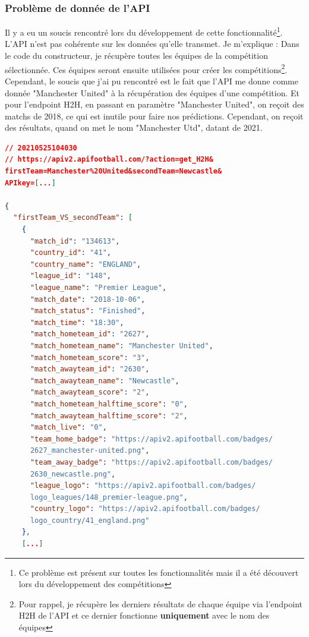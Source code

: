 \documentclass[a4paper,14pt]{extarticle}
\begin{document}
{

\subsubsection{Problème de donnée de l'API}
Il y a eu un soucis rencontré lors du développement de cette fonctionnalité\footnote{Ce problème est présent sur toutes les fonctionnalités mais il a été découvert lors du développement des compétitions}. L'API n'est pas cohérente sur les données qu'elle transmet. Je m'explique :
Dans le code du constructeur, je récupère toutes les équipes de la compétition sélectionnée. Ces équipes seront ensuite utilisées pour créer les compétitions\footnote{Pour rappel, je récupère les derniers résultats de chaque équipe via l'endpoint H2H de l'API et ce dernier fonctionne \textbf{uniquement} avec le nom des équipes}. Cependant, le soucis que j'ai pu rencontré est le fait que l'API me donne comme donnée "Manchester United" à la récupération des équipes d'une compétition. Et pour l'endpoint H2H, en passant en paramètre "Manchester United", on reçoit des matchs de 2018, ce qui est inutile pour faire nos prédictions. Cependant, on reçoit des résultats, quand on met le nom "Manchester Utd", datant de 2021.


\begin{lstlisting}[language=json, firstnumber=1, caption=Aperçu du JSON avec "Manchester United", captionpos=b, label=apercuJSON]
// 20210525104030
// https://apiv2.apifootball.com/?action=get_H2H&
firstTeam=Manchester%20United&secondTeam=Newcastle&
APIkey=[...]

{
  "firstTeam_VS_secondTeam": [
    {
      "match_id": "134613",
      "country_id": "41",
      "country_name": "ENGLAND",
      "league_id": "148",
      "league_name": "Premier League",
      "match_date": "2018-10-06",
      "match_status": "Finished",
      "match_time": "18:30",
      "match_hometeam_id": "2627",
      "match_hometeam_name": "Manchester United",
      "match_hometeam_score": "3",
      "match_awayteam_id": "2630",
      "match_awayteam_name": "Newcastle",
      "match_awayteam_score": "2",
      "match_hometeam_halftime_score": "0",
      "match_awayteam_halftime_score": "2",
      "match_live": "0",
      "team_home_badge": "https://apiv2.apifootball.com/badges/
      2627_manchester-united.png",
      "team_away_badge": "https://apiv2.apifootball.com/badges/
      2630_newcastle.png",
      "league_logo": "https://apiv2.apifootball.com/badges/
      logo_leagues/148_premier-league.png",
      "country_logo": "https://apiv2.apifootball.com/badges/
      logo_country/41_england.png"
    },
    [...]
\end{lstlisting}

}
\end{document}
